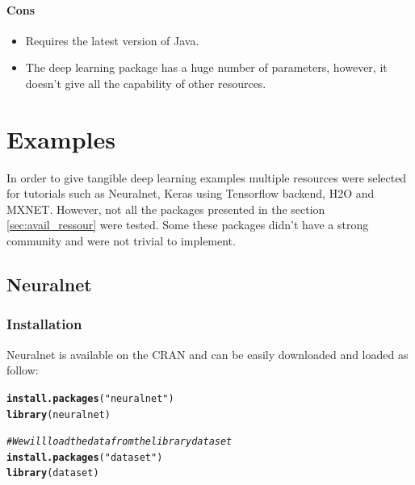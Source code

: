 \documentclass[letter,8pt]{article}\usepackage[]{graphicx}\usepackage[]{color}
\makeatletter
\newcommand{\hlstr}[1]{\textcolor[rgb]{0.192,0.494,0.8}{#1}}%
\newcommand{\hlcom}[1]{\textcolor[rgb]{0.678,0.584,0.686}{\textit{#1}}}%
\newcommand{\hlstd}[1]{\textcolor[rgb]{0.345,0.345,0.345}{#1}}%
\newcommand{\hlkwd}[1]{\textcolor[rgb]{0.737,0.353,0.396}{\textbf{#1}}}%
\newenvironment{kframe}{%
 \def\at@end@of@kframe{}%
 \ifinner\ifhmode%
  \def\at@end@of@kframe{\end{minipage}}%
  \begin{minipage}{\columnwidth}%
 \fi\fi%
 \def\FrameCommand##1{\hskip\@totalleftmargin \hskip-\fboxsep
 \colorbox{shadecolor}{##1}\hskip-\fboxsep
     \hskip-\linewidth \hskip-\@totalleftmargin \hskip\columnwidth}%
 \MakeFramed {\advance\hsize-\width
   \@totalleftmargin\z@ \linewidth\hsize
   \@setminipage}}%
 {\par\unskip\endMakeFramed%
 \at@end@of@kframe}
\newenvironment{knitrout}{}{} %
\makeatother
\begin{document}
\paragraph{Cons}
\begin{itemize}
\item Requires the latest version of Java.
\item The deep learning package has a huge number of parameters, however, it doesn't give all the capability of other resources.
\end{itemize}

\section{Examples}

\label{sec:examples}
In order to give tangible deep learning examples multiple resources were selected for tutorials such as Neuralnet, Keras using Tensorflow backend, H2O and MXNET. However, not all the packages presented in the section \ref{sec:avail_ressour} were tested. Some these packages didn't have a strong community and were not trivial to implement. 
\subsection{Neuralnet}
\subsubsection{Installation}
Neuralnet is available on the CRAN and can be easily downloaded and loaded as follow:
\begin{knitrout}
\color{fgcolor}\begin{kframe}
\begin{alltt}
\hlkwd{install.packages}\hlstd{(}\hlstr{"neuralnet"}\hlstd{)}
\hlkwd{library}\hlstd{(neuralnet)}

\hlcom{# We will load the data from the library dataset}
\hlkwd{install.packages}\hlstd{(}\hlstr{"dataset"}\hlstd{)}
\hlkwd{library}\hlstd{(dataset)}
\end{alltt}
\end{kframe}
\end{knitrout}
\end{document}

